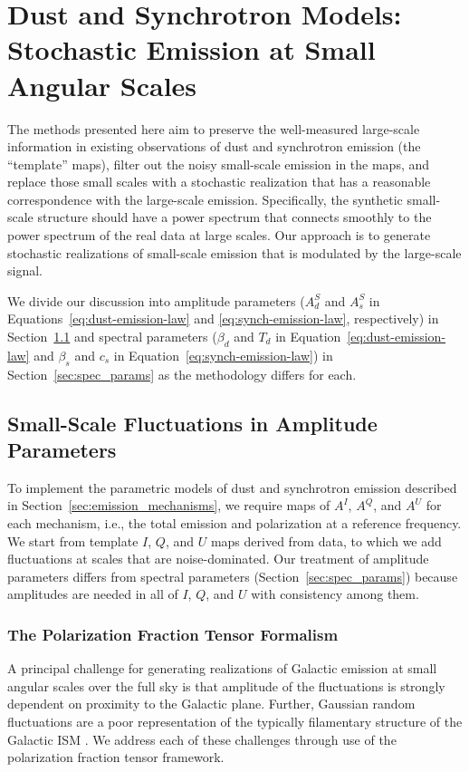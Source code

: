 \documentclass[twocolumn]{aastex631}
\begin{document}
\section{Dust and Synchrotron Models: Stochastic Emission at Small Angular Scales} \label{sec:small_scales}
The methods presented here aim to preserve the well-measured large-scale information in existing observations of dust and synchrotron emission (the ``template'' maps), filter out the noisy small-scale emission in the maps, and replace those small scales with a stochastic realization that has a reasonable correspondence with the large-scale emission. Specifically, the synthetic small-scale structure should have a power spectrum that connects smoothly to the power spectrum of the real data at large scales. 
Our approach is to generate stochastic realizations of small-scale emission that is modulated by the large-scale signal.

We divide our discussion into amplitude parameters ($A_d^S$ and $A_s^S$ in Equations~\ref{eq:dust-emission-law} and \ref{eq:synch-emission-law}, respectively) in Section~\ref{sec:amp_params} and spectral parameters ($\beta_d$ and $T_d$ in Equation~\ref{eq:dust-emission-law} and $\beta_s$ and $c_s$ in Equation~\ref{eq:synch-emission-law}) in Section~\ref{sec:spec_params} as the methodology differs for each.

\subsection{Small-Scale Fluctuations in Amplitude Parameters} \label{sec:amp_params}
To implement the parametric models of dust and synchrotron emission described in Section~\ref{sec:emission_mechanisms}, we require maps of $A^I$, $A^Q$, and $A^U$ for each mechanism, i.e., the total emission and polarization at a reference frequency. We start from template $I$, $Q$, and $U$ maps derived from data, to which we add fluctuations at scales that are noise-dominated. Our treatment of amplitude parameters differs from spectral parameters (Section~\ref{sec:spec_params}) because amplitudes are needed in all of $I$, $Q$, and $U$ with consistency among them.

\subsubsection{The Polarization Fraction Tensor Formalism} \label{sec:polfrac}
A principal challenge for generating realizations of Galactic emission at small angular scales over the full sky is that amplitude of the fluctuations is strongly dependent on proximity to the Galactic plane. Further, Gaussian random fluctuations are a poor representation of the typically filamentary structure of the Galactic ISM \citep[e.g.,][]{Hacar:2023}. We address each of these challenges through use of the polarization fraction tensor framework.
\end{document}
